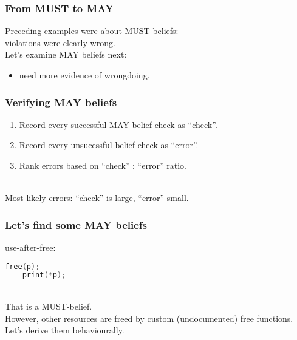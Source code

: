 \documentclass{beamer}
\newenvironment{changemargin}[1]{%
  \begin{list}{}{%
    \setlength{\topsep}{0pt}%
    \setlength{\leftmargin}{#1}%
    \setlength{\rightmargin}{1em}
    \setlength{\listparindent}{\parindent}%
    \setlength{\itemindent}{\parindent}%
    \setlength{\parsep}{\parskip}%
  }%
  \item[]}{\end{list}}
\begin{document}
\begin{frame}[fragile]
\frametitle{From MUST to MAY}
  \begin{changemargin}{2cm}
    Preceding examples were about MUST beliefs:\\
\hspace*{2em} violations were clearly wrong.\\[1em]
    Let's examine MAY beliefs next:\\
    \begin{itemize}
      \item need more evidence of wrongdoing.
    \end{itemize}
  \end{changemargin}
\end{frame}

\begin{frame}
\frametitle{Verifying MAY beliefs}
  \begin{changemargin}{1.5cm}
\begin{enumerate}
\item    Record every successful MAY-belief check as ``check''.\\[1em]
\item    Record every unsucessful belief check as ``error''.\\[1em]
\item    Rank errors based on ``check'' : ``error'' ratio.
\end{enumerate}~\\[1.5em]
    Most likely errors: ``check'' is large, ``error'' small.
  \end{changemargin}
\end{frame}

\begin{frame}[fragile]
\frametitle{Let's find some MAY beliefs}
  \begin{changemargin}{2cm}
    use-after-free: 
 \begin{lstlisting}[language=C]
    free(p);
    print(*p);
 \end{lstlisting}
~\\[1em]
That is a MUST-belief. \\[1em]
However, other resources are freed by custom (undocumented) free functions.\\[1em]
Let's derive them behaviourally.
  \end{changemargin}
\end{frame}
\end{document}
